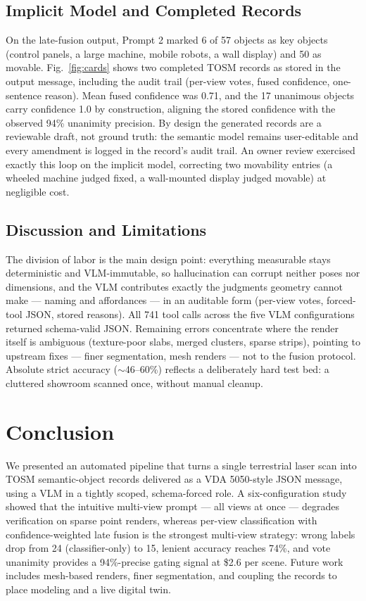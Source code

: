 \documentclass[conference]{IEEEtran}
\begin{document}
\subsection{Implicit Model and Completed Records}
On the late-fusion output, Prompt 2 marked 6 of 57 objects as key objects
(control panels, a large machine, mobile robots, a wall display) and 50 as
movable. Fig.~\ref{fig:cards} shows two completed TOSM records as stored in
the output message, including the audit trail (per-view votes, fused
confidence, one-sentence reason). Mean fused confidence was 0.71, and the
17 unanimous objects carry confidence 1.0 by construction, aligning the
stored confidence with the observed 94\% unanimity precision. By design
the generated records are a reviewable draft, not ground truth: the
semantic model remains user-editable and every amendment is logged in the
record's audit trail. An owner review exercised exactly this loop on the
implicit model, correcting two movability entries (a wheeled machine
judged fixed, a wall-mounted display judged movable) at negligible cost.

\subsection{Discussion and Limitations}
The division of labor is the main design point: everything measurable stays
deterministic and VLM-immutable, so hallucination can corrupt neither poses
nor dimensions, and the VLM contributes exactly the judgments geometry
cannot make --- naming and affordances --- in an auditable form (per-view
votes, forced-tool JSON, stored reasons). All 741 tool calls
across the five VLM configurations returned schema-valid
JSON. Remaining errors concentrate where the render itself is ambiguous
(texture-poor slabs, merged clusters, sparse strips), pointing to upstream
fixes --- finer segmentation, mesh renders --- not to the fusion protocol.
Absolute strict accuracy ($\sim$46--60\%) reflects a deliberately hard
test bed: a cluttered showroom scanned once, without manual cleanup.

\section{Conclusion}
We presented an automated pipeline that turns a single terrestrial laser
scan into TOSM semantic-object records delivered as a VDA 5050-style JSON
message, using a VLM in a tightly scoped, schema-forced role. A
six-configuration study showed that the intuitive multi-view prompt ---
all views at once --- degrades verification on sparse point renders,
whereas per-view classification with confidence-weighted late fusion is the
strongest multi-view strategy: wrong labels drop from 24 (classifier-only)
to 15, lenient accuracy reaches 74\%, and vote unanimity provides a
94\%-precise gating signal at \$2.6 per scene. Future work includes
mesh-based renders, finer segmentation, and coupling the records to place
modeling and a live digital twin.
\end{document}
